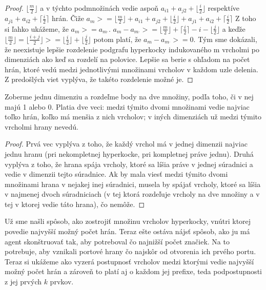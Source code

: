 \begin{proof}
$\lfloor \frac{m}{2} \rfloor$ a v týchto podmnožinách vedie aspoň $a_{i1} +
a_{j2} + \lfloor \frac{i}{2} \rfloor $ respektíve $a_{j1} + a_{i2} + 
\lceil \frac{i}{2} \rceil$ hrán.
Čiže $a_{m} >= \lfloor \frac{m}{2} \rfloor + a_{i1} +
a_{j2} + \lfloor \frac{i}{2} \rfloor + a_{j1} + a_{i2} + 
\lceil \frac{i}{2} \rceil$
Z toho si ľahko ukážeme, že $a_{m} >= a_{m^{,}}$.
 $a_{m} - a_{m^{,}} >= \lfloor \frac{m}{2}\rfloor + \lceil \frac{i}{2}
\rceil - i - \lfloor \frac{j}{2} \rfloor$ a keďže 
$\lfloor \frac{m}{2}\rfloor = \lfloor \frac{i+j}{2}\rfloor >= \lfloor \frac{i}{2} \rfloor + \lfloor \frac{j}{2} \rfloor$
potom platí, že $a_{m} - a_{m^{,}} >=0$. Tým sme dokázali, že neexistuje
lepšie rozdelenie podgrafu hyperkocky indukovaného m vrcholmi po dimenziách 
ako keď sa rozdelí
na polovice. Lepšie sa berie s ohľadom na počet hrán, ktoré vedú medzi
jednotlivými množinami vrcholov v každom uzle delenia.
Z predošlých viet vyplýva, že takéto rozdelenie možné je.
\end{proof}

\begin{lem}
\label{rozdel}
Zoberme jednu dimenziu a rozdeľme body na dve množiny, podľa toho,
či v nej majú 1 alebo 0. Platia dve veci: medzi týmito dvomi množinami vedie
najviac toľko hrán, koľko má menšia z nich vrcholov; v iných dimenziách už
medzi týmito vrcholmi hrany nevedú.
\end{lem}
\begin{proof}
Prvá vec vyplýva z toho, že každý vrchol má v jednej dimenzii najviac jednu
hranu (pri nekompletnej hyperkocke, pri kompletnej práve jednu).
Druhá vyplýva z toho, že hrana spája vrcholy, ktoré sa líšia práve v jednej
súradnici a vedie v dimenzii tejto súradnice. Ak by mala viesť medzi týmito
dvomi množinami hrana v nejakej inej súradnici, musela by spájať vrcholy,
ktoré sa líšia v najmenej dvoch súradniciach (v tej ktorá rozdeľuje vrcholy
na dve množiny a v tej v ktorej vedie táto hrana), čo nemôže.
\end{proof}

Už sme našli spôsob, ako zostrojiť množinu vrcholov hyperkocky, vnútri ktorej
povedie najvyšší možný počet hrán. Teraz ešte ostáva nájsť spôsob, ako ju má
agent skonštruovať tak, aby potreboval čo najnižší počet značiek. Na to
potrebuje, aby vznikali portové hrany čo najskôr od otvorenia ich prvého
portu. Teraz si ukážeme ako vyzerá postupnosť vrcholov medzi ktorými vedie
najvyšší možný počet hrán a zároveň to platí aj o každom jej prefixe, teda
podpostupnosti z jej prvých $k$ prvkov.

